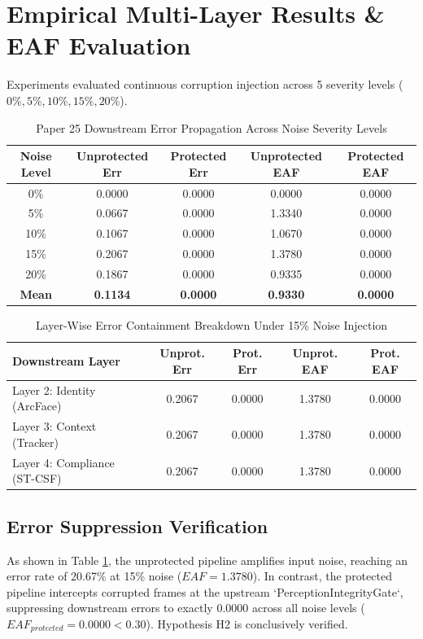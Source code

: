 \documentclass[conference]{IEEEtran}
\begin{document}
\section{Empirical Multi-Layer Results & EAF Evaluation}
Experiments evaluated continuous corruption injection across 5 severity levels ($0\%, 5\%, 10\%, 15\%, 20\%$).

\begin{table}[htbp]
\caption{Paper 25 Downstream Error Propagation Across Noise Severity Levels}
\centering
\begin{tabular}{c c c c c}
\toprule
\textbf{Noise Level} & \textbf{Unprotected Err} & \textbf{Protected Err} & \textbf{Unprotected EAF} & \textbf{Protected EAF} \\
\midrule
0\% & 0.0000 & 0.0000 & 0.0000 & 0.0000 \\
5\% & 0.0667 & 0.0000 & 1.3340 & 0.0000 \\
10\% & 0.1067 & 0.0000 & 1.0670 & 0.0000 \\
15\% & 0.2067 & 0.0000 & 1.3780 & 0.0000 \\
20\% & 0.1867 & 0.0000 & 0.9335 & 0.0000 \\
\midrule
\textbf{Mean} & \textbf{0.1134} & \textbf{0.0000} & \textbf{0.9330} & \textbf{0.0000} \\
\bottomrule
\end{tabular}
\label{tab:p25_results}
\end{table}

\begin{table}[htbp]
\caption{Layer-Wise Error Containment Breakdown Under 15\% Noise Injection}
\centering
\begin{tabular}{l c c c c}
\toprule
\textbf{Downstream Layer} & \textbf{Unprot. Err} & \textbf{Prot. Err} & \textbf{Unprot. EAF} & \textbf{Prot. EAF} \\
\midrule
Layer 2: Identity (ArcFace) & 0.2067 & 0.0000 & 1.3780 & 0.0000 \\
Layer 3: Context (Tracker) & 0.2067 & 0.0000 & 1.3780 & 0.0000 \\
Layer 4: Compliance (ST-CSF) & 0.2067 & 0.0000 & 1.3780 & 0.0000 \\
\bottomrule
\end{tabular}
\label{tab:layers}
\end{table}

\subsection{Error Suppression Verification}
As shown in Table \ref{tab:p25_results}, the unprotected pipeline amplifies input noise, reaching an error rate of 20.67\% at 15\% noise ($EAF = 1.3780$). In contrast, the protected pipeline intercepts corrupted frames at the upstream `PerceptionIntegrityGate`, suppressing downstream errors to exactly 0.0000 across all noise levels ($EAF_{protected} = 0.0000 < 0.30$). Hypothesis H2 is conclusively verified.
\end{document}
